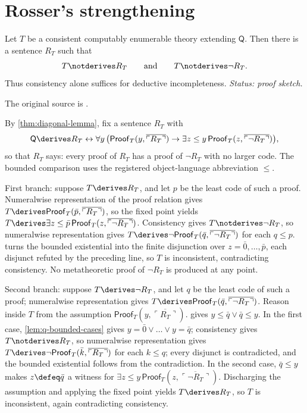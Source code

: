 \section{Rosser's strengthening}
\label{sec:first-incompleteness-04}

\begin{theorem}[Rosser]
\label{thm:rosser}
Let \(T\) be a consistent computably enumerable theory extending \(\mathsf Q\).
Then there is
a sentence \(R_T\) such that
\[
  T\notderives R_T
  \qquad\text{and}\qquad
  T\notderives\neg R_T.
\]
Thus consistency alone suffices for deductive incompleteness.
\textit{Status: proof sketch.}
\end{theorem}

The original source is \cite{Rosser1936}.

\begin{proofplan}
By \cref{thm:diagonal-lemma}, fix a sentence \(R_T\) with
\[
  \mathsf Q\derives R_T\leftrightarrow\forall y\,\bigl(
  \mathsf{Proof}_T(y,\overline{\ulcorner R_T\urcorner})\to
  \exists z\leq y\,
  \mathsf{Proof}_T(z,\overline{\ulcorner\neg R_T\urcorner})\bigr),
\]
so that \(R_T\) says: every proof of \(R_T\) has a proof of \(\neg R_T\)
with no larger code.  The bounded comparison uses the registered
object-language abbreviation \(\leq\).

First branch: suppose \(T\derives R_T\), and let \(p\) be the least code
of such a proof.  Numeralwise representation of the proof relation gives
\(T\derives\mathsf{Proof}_T(\bar p,\overline{\ulcorner R_T\urcorner})\),
so the fixed point yields
\(T\derives\exists z\leq\bar p\,
\mathsf{Proof}_T(z,\overline{\ulcorner\neg R_T\urcorner})\).
Consistency gives \(T\notderives\neg R_T\), so numeralwise representation
gives
\(T\derives\neg\mathsf{Proof}_T(\bar q,
\overline{\ulcorner\neg R_T\urcorner})\) for each \(q\leq p\).
 turns the bounded existential into the finite
disjunction over \(z=\bar0,\ldots,\bar p\), each disjunct refuted by the
preceding line, so \(T\) is inconsistent, contradicting consistency.  No
metatheoretic proof of \(\neg R_T\) is produced at any point.

Second branch: suppose \(T\derives\neg R_T\), and let \(q\) be the least
code of such a proof; numeralwise representation gives
\(T\derives\mathsf{Proof}_T(\bar q,
\overline{\ulcorner\neg R_T\urcorner})\).  Reason inside \(T\) from the
assumption \(\mathsf{Proof}_T(y,\overline{\ulcorner R_T\urcorner})\).
 gives \(y\leq\bar q\lor\bar q\leq y\).  In the
first case, \cref{lem:q-bounded-cases} gives
\(y=\bar0\lor\dots\lor y=\bar q\); consistency gives
\(T\notderives R_T\), so numeralwise representation gives
\(T\derives\neg\mathsf{Proof}_T(\bar k,
\overline{\ulcorner R_T\urcorner})\) for each \(k\leq q\); every
disjunct is contradicted, and the bounded existential follows from the
contradiction.  In the second case, \(\bar q\leq y\) makes
\(z\defeq\bar q\) a witness for
\(\exists z\leq y\,
\mathsf{Proof}_T(z,\overline{\ulcorner\neg R_T\urcorner})\).
Discharging the assumption and applying the fixed point yields
\(T\derives R_T\), so \(T\) is inconsistent, again contradicting
consistency.


\end{proofplan}
